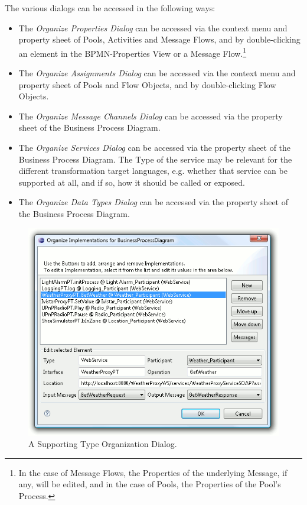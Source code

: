 The various dialogs can be accessed in the following ways:
\begin{itemize}
	\item The \emph{Organize Properties Dialog} can be accessed via the context
	menu and property sheet of Pools, Activities and Message Flows, and by
	double-clicking an element in the BPMN-Properties View or a Message
	Flow.\footnote{In the case of Message Flows, the Properties of the underlying
	Message, if any, will be edited, and in the case of Pools, the Properties of
	the Pool's Process.}

	\item The \emph{Organize Assignments Dialog} can be accessed via the context
	menu and property sheet of Pools and Flow Objects, and by double-clicking
	Flow Objects.

	\item The \emph{Organize Message Channels Dialog} can be accessed via the
	property sheet of the Business Process Diagram.

	\item The \emph{Organize Services Dialog} can be accessed via the property
	sheet of the Business Process Diagram. The Type of the service may be relevant
	for the different transformation target languages, e.g. whether that service
	can be supported at all, and if so, how it should be called or exposed.

	\item The \emph{Organize Data Types Dialog} can be accessed via the property
	sheet of the Business Process Diagram.
\end{itemize}

\begin{figure}[ht]
	\centering
	\includegraphics[width=.5\textwidth]{figures/features/dialog.png}
	\caption{A Supporting Type Organization Dialog.}
	\label{fig:dialog}
\end{figure}




